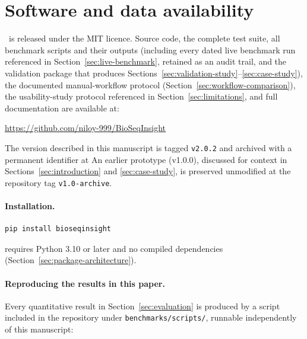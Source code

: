\section{Software and data availability}
\label{sec:availability}

\bsi\ is released under the MIT licence. Source code, the complete test
suite, all benchmark scripts and their outputs (including every dated live
benchmark run referenced in Section~\ref{sec:live-benchmark}, retained as an
audit trail, and the validation package that produces Sections~\ref{sec:validation-study}--\ref{sec:case-study}), the documented manual-workflow protocol
(Section~\ref{sec:workflow-comparison}), the usability-study protocol
referenced in Section~\ref{sec:limitations}, and full documentation are
available at:

\begin{center}
\url{https://github.com/niloy-999/BioSeqInsight}
\end{center}

\noindent The version described in this manuscript is tagged
\texttt{v2.0.2} and archived with a permanent identifier at
 An earlier prototype
(v1.0.0), discussed for context in Sections~\ref{sec:introduction} and
\ref{sec:case-study}, is preserved unmodified at the repository tag
\texttt{v1.0-archive}.

\paragraph{Installation.}
\begin{lstlisting}
pip install bioseqinsight
\end{lstlisting}
requires Python 3.10 or later and no compiled dependencies
(Section~\ref{sec:package-architecture}). 

\paragraph{Reproducing the results in this paper.}
Every quantitative result in Section~\ref{sec:evaluation} is produced by a
script included in the repository under \texttt{benchmarks/scripts/}, runnable
independently of this manuscript:

